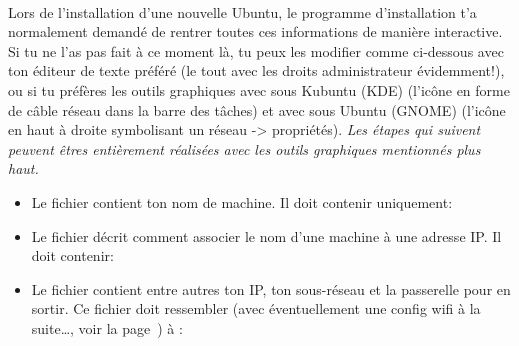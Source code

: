 \paragraph{}
\label{Ubuntu:IP}

Lors de l'installation d'une nouvelle Ubuntu, le programme d'installation t'a normalement demand\'e de rentrer toutes ces informations de mani\`ere
interactive. Si tu ne l'as pas fait \`a ce moment l\`a, tu peux les modifier comme ci-dessous avec ton \'editeur de texte pr\'ef\'er\'e (le tout avec les droits
administrateur \'evidemment!), ou si tu pr\'ef\`eres les outils graphiques avec  sous Kubuntu (KDE) (l'ic\^one en forme de c\^able r\'eseau dans
la barre des t\^aches) et avec  sous Ubuntu (GNOME) (l'ic\^one en haut \`a droite symbolisant un r\'eseau -> propri\'et\'es).
\newline
\newline
\textit{Les \'etapes qui suivent peuvent \^etres enti\`erement r\'ealis\'ees avec les outils graphiques mentionn\'es plus haut.}
\newline
\begin{itemize}
\item Le fichier  contient ton nom de machine. Il doit contenir uniquement:


\item Le fichier  d\'ecrit comment associer le nom d'une machine \`a une adresse IP.
Il doit contenir:


\item Le fichier  contient entre autres ton IP,
ton sous-r\'eseau et la passerelle pour en sortir. Ce fichier doit
ressembler (avec \'eventuellement une config wifi \`a la suite\ldots,
voir la page~\pageref{wifi}) \`a :


\end{itemize}

